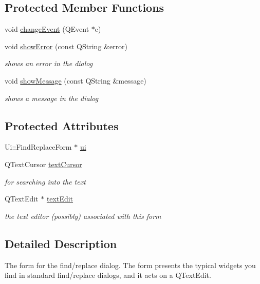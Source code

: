 \subsection*{Protected Member Functions}
\begin{DoxyCompactItemize}
\item 
void \hyperlink{class_find_replace_form_a67f57e1f82d146cd0019cd64aa147e4b}{change\+Event} (Q\+Event $\ast$e)
\item 
void \hyperlink{class_find_replace_form_a49bcdfa2193f0fb5fa8ccbbf1875d893}{show\+Error} (const Q\+String \&error)
\begin{DoxyCompactList}\small\item\em shows an error in the dialog \end{DoxyCompactList}\item 
void \hyperlink{class_find_replace_form_a39929b108e4e85a9d64366777e9fde22}{show\+Message} (const Q\+String \&message)
\begin{DoxyCompactList}\small\item\em shows a message in the dialog \end{DoxyCompactList}\end{DoxyCompactItemize}
\subsection*{Protected Attributes}
\begin{DoxyCompactItemize}
\item 
Ui\+::\+Find\+Replace\+Form $\ast$ \hyperlink{class_find_replace_form_a9bf9e9096feff863dcd6c2a989e07d2c}{ui}
\item 
Q\+Text\+Cursor \hyperlink{class_find_replace_form_acbbc970423e9e4dfcee99d53e02d8eb2}{text\+Cursor}
\begin{DoxyCompactList}\small\item\em for searching into the text \end{DoxyCompactList}\item 
Q\+Text\+Edit $\ast$ \hyperlink{class_find_replace_form_a6ddb6c32035bcafdd085c457c1ac125c}{text\+Edit}
\begin{DoxyCompactList}\small\item\em the text editor (possibly) associated with this form \end{DoxyCompactList}\end{DoxyCompactItemize}


\subsection{Detailed Description}
The form for the find/replace dialog. The form presents the typical widgets you find in standard find/replace dialogs, and it acts on a Q\+Text\+Edit.



